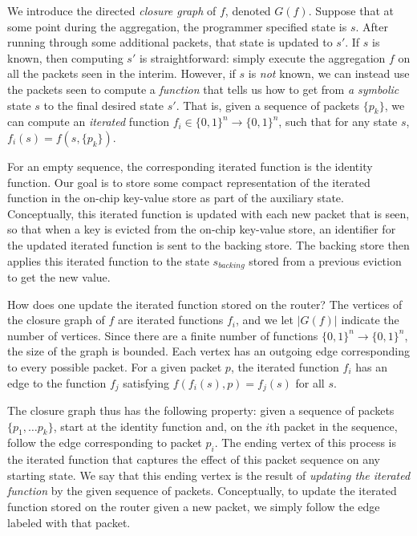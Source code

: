We introduce the directed \emph{closure graph} of $f$, denoted $G(f)$. Suppose
that at some point during the aggregation, the programmer specified state is
$s$. After running through some additional packets, that state is updated to
$s'$. If $s$ is known, then computing $s'$ is straightforward: simply execute
the aggregation $f$ on all the packets seen in the interim. However, if $s$ is
\emph{not} known, we can instead use the packets seen to compute a {\em function}
that tells us how to get from \emph{a symbolic} state $s$ to the final desired
state $s'$. That is, given a sequence of packets $\{p_k\}$, we can compute an
\emph{iterated} function $f_i \in \{0,1\}^n \rightarrow \{0,1\}^n$, such that
for any state $s$, $f_i(s) = f(s, \{p_k\})$.

For an empty sequence, the corresponding iterated function is the identity
function.  Our goal is to store some compact representation of the iterated
function in the on-chip key-value store as part of the auxiliary state.
Conceptually, this iterated function is updated with each new packet that is
seen, so that when a key is evicted from the on-chip key-value store, an
identifier for the updated iterated function is sent to the backing store.  The
backing store then applies this iterated function to the state $s_{backing}$
stored from a previous eviction to get the new value.

How does one update the iterated function stored on the router? The vertices of
the closure graph of $f$ are iterated functions $f_i$, and we let $|G(f)|$
indicate the number of vertices. Since there are a finite number of functions
$\{0, 1\}^n \rightarrow \{0, 1\}^n$, the size of the graph is bounded.  Each
vertex has an outgoing edge corresponding to every possible packet. For a given
packet $p$, the iterated function $f_i$ has an edge to the function $f_j$
satisfying $f(f_i(s), p) = f_j(s)$ for all $s$.

The closure graph thus has the following property: given a sequence of packets
$\{p_1, \ldots p_k\}$, start at the identity function and, on the $i$th packet
in the sequence, follow the edge corresponding to packet $p_i$. The ending
vertex of this process is the iterated function that captures the effect of
this packet sequence on any starting state. We say that this ending vertex is
the result of \emph{updating the iterated function} by the given sequence of
packets. Conceptually, to update the iterated function stored on the router
given a new packet, we simply follow the edge labeled with that packet.

